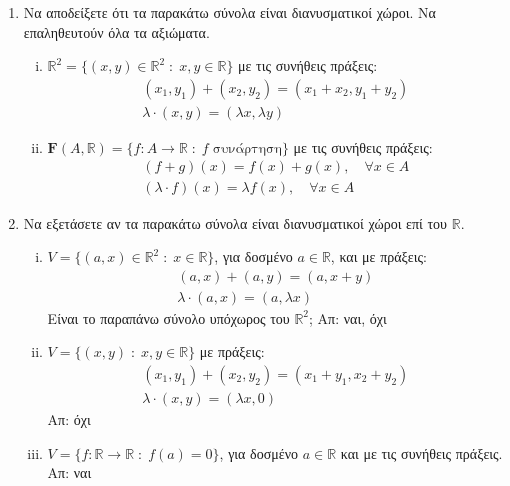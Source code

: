 \begin{enumerate}

  \item Να αποδείξετε ότι τα παρακάτω σύνολα είναι διανυσματικοί χώροι. Να 
    επαληθευτούν όλα τα αξιώματα.
    \begin{enumerate}[i)]
      \item $ \mathbb{R}^{2} = \{(x,y)\in \mathbb{R}^{2} 
        \; : \; x,y \in \mathbb{R} \} $ με τις συνήθεις πράξεις:
        \begin{gather*}
          (x_{1}, y_{1}) + (x_{2}, y_{2}) = (x_{1}+ x_{2}, y_{1}+ y_{2}) \\
          \lambda \cdot (x,y) = (\lambda x, \lambda y)
        \end{gather*}

      \item $ \mathbf{F}(A, \mathbb{R}) = \{ f \colon A \to \mathbb{R} 
        \; : \; f \; \text{συνάρτηση} \} $ με τις συνήθεις πράξεις:
        \begin{gather*}
          (f+g)(x) = f(x)+g(x), \quad \forall x \in A \\
          (\lambda  \cdot f)(x) = \lambda f(x), \quad \forall x \in A
        \end{gather*} 
    \end{enumerate}

  \item Να εξετάσετε αν τα παρακάτω σύνολα είναι διανυσματικοί χώροι επί του 
    $\mathbb{R}$.
    \begin{enumerate}[i)]
      \item $ V = \{ (a,x) \in \mathbb{R}^{2} \; : \; x \in \mathbb{R} \} $, 
        για δοσμένο $ a \in \mathbb{R} $, και με πράξεις: 
        \begin{gather*}
          (a,x) + (a,y) = (a,x+y) \\
          \lambda \cdot (a,x) = (a, \lambda x)
        \end{gather*}
        Είναι το παραπάνω σύνολο υπόχωρος του $ \mathbb{R}^{2} $;
        \hfill Απ: ναι, όχι 
      \item $ V = \{(x,y) \; : \; x,y \in \mathbb{R} \} $ με πράξεις: 
        \begin{gather*}
          (x_{1}, y_{1}) + (x_{2}, y_{2}) = (x_{1}+ y_{1}, x_{2}+ y_{2}) \\
          \lambda \cdot (x,y) = (\lambda x, 0) 
        \end{gather*} 
        \hfill Απ: όχι 
      \item $ V = \{ f \colon \mathbb{R} \to \mathbb{R} \; : \; f(a) = 0 \} $, 
        για δοσμένο $ a \in \mathbb{R} $ και με τις συνήθεις πράξεις. 
        \hfill Απ: ναι 
    \end{enumerate}

\end{enumerate}




